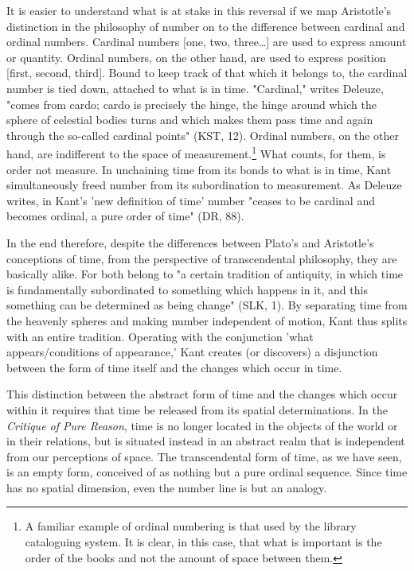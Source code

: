 It is easier to understand what is at stake in this reversal if we map Aristotle's distinction in the philosophy of number on to the difference between cardinal and ordinal numbers. Cardinal numbers [one, two, three\dots] are used to express amount or quantity. Ordinal numbers, on the other hand, are used to express position [first, second, third]. Bound to keep track of that which it belongs to, the cardinal number is tied down, attached to what is in time. "Cardinal," writes Deleuze, "comes from cardo; cardo is precisely the hinge, the hinge around which the sphere of celestial bodies turns and which makes them pass time and again through the so-called cardinal points" (KST, 12). Ordinal numbers, on the other hand, are indifferent to the space of measurement.\footnote{A familiar example of ordinal numbering is that used by the library cataloguing system. It is clear, in this case, that what is important is the order of the books and not the amount of space between them.} What counts, for them, is order not measure. In unchaining time from its bonds to what is in time, Kant simultaneously freed number from its subordination to measurement. As Deleuze writes, in Kant's 'new definition of time' number "ceases to be cardinal and becomes ordinal, a pure order of time" (DR, 88).

In the end therefore, despite the differences between Plato's and Aristotle's conceptions of time, from the perspective of transcendental philosophy, they are basically alike. For both belong to "a certain tradition of antiquity, in which time is fundamentally subordinated to something which happens in it, and this something can be determined as being change" (SLK, 1). By separating time from the heavenly spheres and making number independent of motion, Kant thus splits with an entire tradition. Operating with the conjunction 'what appears/conditions of appearance,' Kant creates (or discovers) a disjunction between the form of time itself and the changes which occur in time.

This distinction between the abstract form of time and the changes which occur within it requires that time be released from its spatial determinations. In the \textit{Critique of Pure Reason}, time is no longer located in the objects of the world or in their relations, but is situated instead in an abstract realm that is independent from our perceptions of space. The transcendental form of time, as we have seen, is an empty form, conceived of as nothing but a pure ordinal sequence. Since time has no spatial dimension, even the number line is but an analogy.

